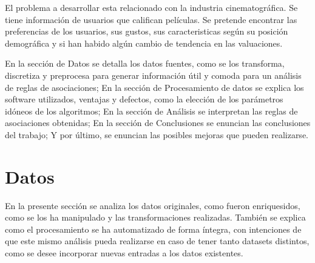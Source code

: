 \documentclass[journal]{IEEEtran}
\begin{document}
El problema a desarrollar esta relacionado con la industria cinematográfica.
Se tiene información de usuarios que califican películas. Se pretende encontrar
las preferencias de los usuarios, sus gustos, sus caracteristicas según su
posición demográfica y si han habido algún cambio de tendencia en las valuaciones.

En la sección de Datos se detalla los datos fuentes, como se los transforma,
discretiza y preprocesa para generar información útil y comoda para un análisis
de reglas de asociaciones; En la sección de Procesamiento de datos se 
explica los software utilizados, ventajas y defectos, como la elección de los
parámetros idóneos de los algoritmos; En la sección de Análisis se interpretan
las reglas de asociaciones obtenidas; En la sección de Conclusiones se enuncian
las conclusiones del trabajo; Y por último, se enuncian las posibles mejoras
que pueden realizarse.



\section{Datos}
En la presente sección se analiza los datos originales, como fueron enriquesidos,
como se los ha manipulado y las transformaciones realizadas. También se explica como 
el procesamiento se ha automatizado 
de forma íntegra, con intenciones de que este mismo análisis 
pueda realizarse en caso de tener tanto datasets distintos, como se desee incorporar
nuevas entradas a los datos existentes.
\end{document}
